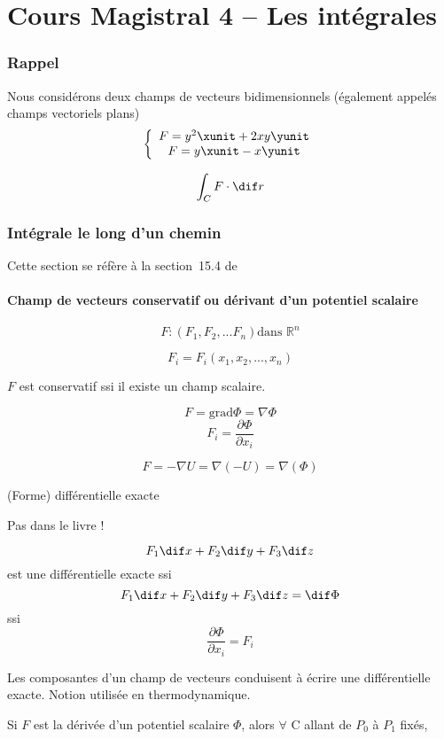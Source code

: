 \part{Cours Magistral 4 -- Les intégrales}
\section{Rappel}

Nous considérons deux champs de vecteurs bidimensionnels (également appelés champs vectoriels plans)
\[
\left\{
\begin{array}{c}
F=y^2\xunit+2xy\yunit\\
F = y\xunit-x\yunit
\end{array}
\right.
\]

\[\int_C F\cdot \dif r \]

\section{Intégrale le long d'un chemin}
Cette section se réfère à la section~15.4 de~\cite{adams2013calculus}

\subsection{Champ de vecteurs conservatif ou dérivant d'un potentiel scalaire}

\[F:(F_1,F_2,...F_n)\text{dans } \mathbb{R}^n\]

\[F_i=F_i(x_1,x_2,...,x_n)\]

$F$ est conservatif ssi il existe un champ scalaire.

\[F=\text{grad}\Phi = \nabla \Phi\]
\[F_i=\frac{\partial \Phi}{\partial x_i}\]
\begin{myrem}
\[F=-\nabla U = \nabla (- U ) = \nabla ( \Phi ) \]
\end{myrem}

\begin{myrem}{(Forme) différentielle exacte}

Pas dans le livre !

\[F_1 \dif x +F_2 \dif y + F_3 \dif z \] est une différentielle exacte ssi\[F_1 \dif x +F_2 \dif y + F_3 \dif z  = \dif\Phi\]
ssi
\[\frac{\partial \Phi}{\partial x_i} = F_i\]
\end{myrem}

Les composantes d'un champ de vecteurs conduisent à écrire une différentielle exacte. Notion utilisée en thermodynamique.

Si $F$ est la dérivée d'un potentiel scalaire $\Phi$, alors $\forall$ C allant de $P_0$ à $P_1$ fixés,


